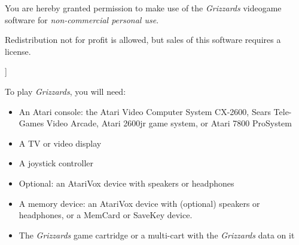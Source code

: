 \documentclass[10pt,twocolumn,openany,article]{memoir}
\begin{document}
\bigskip

You are hereby granted permission  to make use of the \textit{Grizzards}
videogame software for \emph{non-commercial personal use}.

Redistribution not for profit is allowed, but sales of this software
requires a license.

]

\let\cleardoublepage\clearpage

\mainmatter

\tableofcontents


To play \textit{Grizzards}, you will need:

\begin{itemize}
\item An Atari  console: the Atari Video Computer  System CX-2600, Sears
  Tele-Games  Video Arcade,  Atari  2600jr game  system,  or Atari  7800
  ProSystem
\item A TV or video display
\item A joystick controller
  \ifdefined\ATARIAGESAVE
  \item Optional: an AtariVox device with speakers or headphones
  \else
  \ifdefined\NOSAVE\else
\item A  memory device: an  AtariVox device with (optional)  speakers or
  headphones, or a MemCard or SaveKey device.
  \fi\fi
\item The \textit{Grizzards} game cartridge \ifdefined\ATARIAGESAVE\else
  or a multi-cart with the \textit{Grizzards} data on it \fi
\end{itemize}
\end{document}
